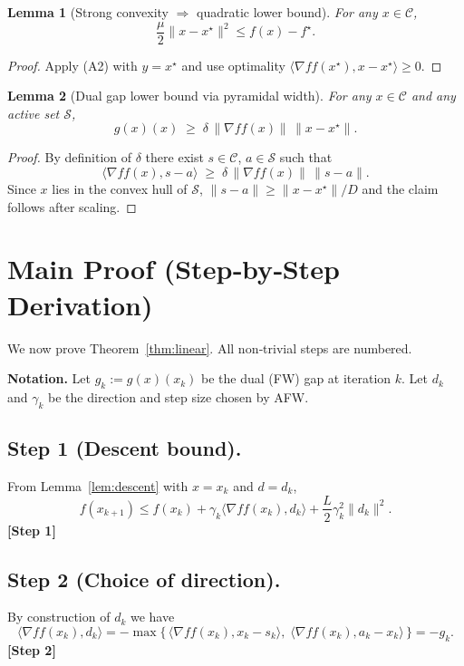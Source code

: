 \documentclass[11pt]{article}
\newtheorem{lemma}{Lemma}
\newcommand{\C}{\mathcal{C}}
\newcommand{\gap}{g(x)}
\newcommand{\width}{\delta}
\newcommand{\grad}{\nabla f}
\begin{document}
\begin{lemma}[Strong convexity $\Rightarrow$ quadratic lower bound]\label{lem:strong}
For any $x\in\C$,
\[
\frac{\mu}{2}\|x-x^{\star}\|^{2}\le f(x)-f^{\star}.
\tag{10}
\]
\end{lemma}
\begin{proof}
Apply (A2) with $y=x^{\star}$ and use optimality $\langle \grad f(x^{\star}),x-x^{\star}\rangle\ge0$.
\end{proof}

\begin{lemma}[Dual gap lower bound via pyramidal width]\label{lem:gap}
For any $x\in\C$ and any active set $\mathcal{S}$,
\[
\gap(x)\;\ge\; \width \,\|\grad f(x)\|\,\|x-x^{\star}\|.
\tag{11}
\]
\end{lemma}
\begin{proof}
By definition of $\width$ there exist $s\in\C$, $a\in\mathcal{S}$ such that
\[
\langle \grad f(x),s-a\rangle\;\ge\;\width\,\|\grad f(x)\|\,\|s-a\|.
\]
Since $x$ lies in the convex hull of $\mathcal{S}$,
$\|s-a\|\ge \|x-x^{\star}\|/D$ and the claim follows after scaling.
\end{proof}

\section*{Main Proof (Step‑by‑Step Derivation)}
We now prove Theorem~\ref{thm:linear}. All non‑trivial steps are numbered.

\noindent\textbf{Notation.} Let $g_{k}:=\gap(x_{k})$ be the dual (FW) gap at iteration $k$.
Let $d_{k}$ and $\gamma_{k}$ be the direction and step size chosen by AFW.

\subsection*{Step 1 (Descent bound).}
From Lemma~\ref{lem:descent} with $x=x_{k}$ and $d=d_{k}$,
\[
f(x_{k+1})\le f(x_{k})+\gamma_{k}\langle\grad f(x_{k}),d_{k}\rangle
+\frac{L}{2}\gamma_{k}^{2}\|d_{k}\|^{2}.
\tag{12}
\]
\textbf{[Step 1]}

\subsection*{Step 2 (Choice of direction).}
By construction of $d_{k}$ we have
\[
\langle\grad f(x_{k}),d_{k}\rangle=
-\max\bigl\{\,\langle\grad f(x_{k}),x_{k}-s_{k}\rangle,
\;\langle\grad f(x_{k}),a_{k}-x_{k}\rangle\,\bigr\}
=-g_{k}.
\tag{13}
\]
\textbf{[Step 2]}
\end{document}
